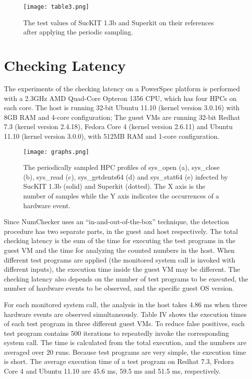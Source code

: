 \documentclass[12pt]{report}
\begin{document}
\begin{figure}[h]
\centering
\texttt{[image: table3.png]}
\caption{The test values of SucKIT 1.3b and Superkit on their references after applying the periodic sampling.}
\end{figure}

\section{Checking Latency}
The experiments of the checking latency on a
PowerSpec platform is performed with a 2.3GHz AMD Quad-Core Opteron
1356 CPU, which has four HPCs on each core. The host
is running 32-bit Ubuntu 11.10 (kernel version 3.0.16) with
8GB RAM and 4-core configuration; The guest VMs are
running 32-bit Redhat 7.3 (kernel version 2.4.18), Fedora Core
4 (kernel version 2.6.11) and Ubuntu 11.10 (kernel version
3.0.0), with 512MB RAM and 1-core configuration.

\begin{figure}[h]
\centering
\texttt{[image: graphs.png]}
\caption{The periodically sampled HPC profiles of sys\_open (a), sys\_close (b), sys\_read (c), sys\_getdents64 (d) and sys\_stat64 (e) infected
by SucKIT 1.3b (solid) and Superkit (dotted). The X axis is the number of samples while the Y axis indicates the occurrences of a hardware
event.}
\end{figure}

Since NumChecker uses an “in-and-out-of-the-box” technique,
the detection procedure has two separate parts, in the
guest and host respectively. The total checking latency is the
sum of the time for executing the test programs in the guest
VM and the time for analyzing the counted numbers in the
host. When different test programs are applied (the monitored
system call is invoked with different inputs), the execution time
inside the guest VM may be different. The checking latency
also depends on the number of test programs to be executed,
the number of hardware events to be observed, and the specific
guest OS version.

For each monitored system call, the analysis in the host
takes 4.86 ms when three hardware events are observed
simultaneously. Table IV shows the execution times of each
test program in three different guest VMs. To reduce false positives,
each test program contains 500 iterations to repeatedly
invoke the corresponding system call. The time is calculated
from the total execution, and the numbers are averaged over
20 runs. Because test programs are very simple, the execution
time is short. The average execution time of a test program
on Redhat 7.3, Fedora Core 4 and Ubuntu 11.10 are 45.6 ms,
59.5 ms and 51.5 ms, respectively.
\end{document}
